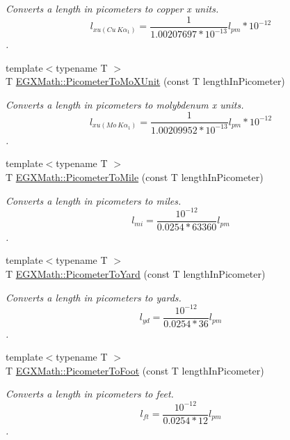 \begin{DoxyCompactItemize}
\begin{DoxyCompactList}\small\item\em Converts a length in picometers to copper x units. \[ l_{xu(Cu\ K\alpha_1)}= \frac{1}{1.00207697*10^{-13}} l_{pm} * 10^{-12}\]. \end{DoxyCompactList}\item 
{\footnotesize template$<$typename T $>$ }\\T \mbox{\hyperlink{group___e_g_x_math-_conversions-_length_conversions-_s_i-_picometer-_non-_s_i_ga51b96b4bb30b7e9c971db81ff89a82f8}{E\+G\+X\+Math\+::\+Picometer\+To\+Mo\+X\+Unit}} (const T length\+In\+Picometer)
\begin{DoxyCompactList}\small\item\em Converts a length in picometers to molybdenum x units. \[ l_{xu(Mo\ K\alpha_1)}=\frac{1}{1.00209952*10^{-13}} l_{pm} * 10^{-12}\]. \end{DoxyCompactList}\item 
{\footnotesize template$<$typename T $>$ }\\T \mbox{\hyperlink{group___e_g_x_math-_conversions-_length_conversions-_s_i-_picometer-_imperial_gae153bd94c8377dd95b8b09bcc56256b0}{E\+G\+X\+Math\+::\+Picometer\+To\+Mile}} (const T length\+In\+Picometer)
\begin{DoxyCompactList}\small\item\em Converts a length in picometers to miles. \[ l_{mi}=\frac{10^{-12}}{0.0254 * 63360} l_{pm} \]. \end{DoxyCompactList}\item 
{\footnotesize template$<$typename T $>$ }\\T \mbox{\hyperlink{group___e_g_x_math-_conversions-_length_conversions-_s_i-_picometer-_imperial_ga18b17a118ffb1092beefc221f44a97a2}{E\+G\+X\+Math\+::\+Picometer\+To\+Yard}} (const T length\+In\+Picometer)
\begin{DoxyCompactList}\small\item\em Converts a length in picometers to yards. \[ l_{yd}= \frac{10^{-12}}{0.0254 * 36} l_{pm} \]. \end{DoxyCompactList}\item 
{\footnotesize template$<$typename T $>$ }\\T \mbox{\hyperlink{group___e_g_x_math-_conversions-_length_conversions-_s_i-_picometer-_imperial_gae83808c99fe5c49c54717302f667ff46}{E\+G\+X\+Math\+::\+Picometer\+To\+Foot}} (const T length\+In\+Picometer)
\begin{DoxyCompactList}\small\item\em Converts a length in picometers to feet. \[ l_{ft}= \frac{10^{-12}}{0.0254 * 12} l_{pm} \]. \end{DoxyCompactList}\item 

\end{DoxyCompactItemize}
